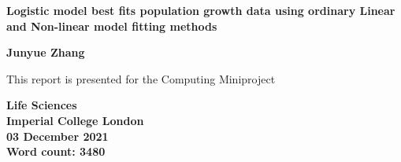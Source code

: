 \begin{titlepage}
    \begin{center}
        \vspace*{1cm}
            
        \Huge
        \textbf{Logistic model best fits population growth data using ordinary Linear and Non-linear model fitting methods}
        
        \vspace{2cm}
            
        \textbf{Junyue Zhang}
            
        \vfill
            
        This report is presented for the Computing Miniproject
        
        \vspace{0.8cm}
            
        \Large
        \textbf{Life Sciences}\\
        \textbf{Imperial College London}\\
        \textbf{03 December 2021}\\
        \textbf{Word count: 3480} 
            
    \end{center}
\end{titlepage}